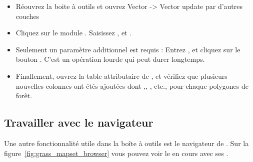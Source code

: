 \begin{itemize}[label=--]
\item Réouvrez la boite à outils \grass et ouvrez Vector -> Vector update par d'autres couches
\item Cliquez sur le module . Saisissez , et .
\item Seulement un paramètre additionnel est requis : Entrez  , et cliquez sur le bouton . C'est un opération lourde qui peut durer longtemps.
\item Finallement, ouvrez la table attributaire de , et vérifiez que plusieurs nouvelles colonnes ont étés ajoutées dont ,, , etc., pour chaque polygones de forêt.
\end{itemize}

\subsection{Travailler avec le navigateur \grass} 

Une autre fonctionnalité utile dans la boîte à outils \grass est le navigateur de  \grass. Sur la figure~\ref{fig:grass_mapset_browser}
vous pouvez voir le  en cours  avec ses .

